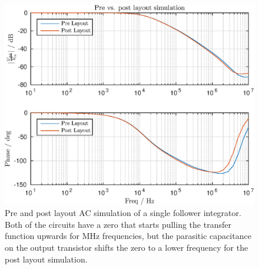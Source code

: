 \begin{figure}
    \center
    \includegraphics{fig1.eps}
    \caption{Pre and post layout AC simulation of a single follower integrator. Both of the circuits have a zero that 
    starts pulling the transfer function upwards for MHz frequencies, but the parasitic capacitance on the output transistor 
shifts the zero to a lower frequency for the post layout simulation.}
    \label{}
\end{figure}


